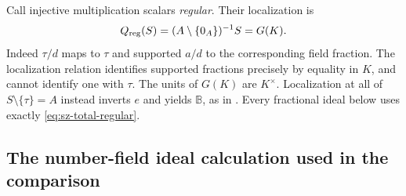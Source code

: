 Call injective multiplication scalars \emph{regular}. Their localization is
\begin{equation}\label{eq:sz-total-regular}
 Q_{\rm reg}(S)=(A\setminus\{0_A\})^{-1}S=G(K).
\end{equation}
Indeed \(\tau/d\) maps to \(\tau\) and supported \(a/d\) to the
corresponding field fraction. The localization relation identifies
supported fractions precisely by equality in \(K\), and cannot identify
one with \(\tau\). The units of \(G(K)\) are \(K^\times\).
Localization at all of \(S\setminus\{\tau\}=A\) instead inverts \(e\)
and yields \(\mathbb B\), as in
\cite[\texttt{thm:frac-collapse}]{globalization}. Every fractional
ideal below uses exactly \eqref{eq:sz-total-regular}.

\subsection{The number-field ideal calculation used in the comparison}

